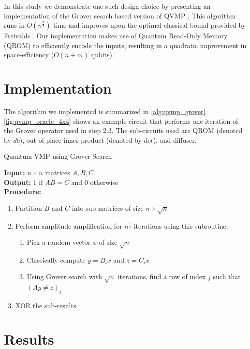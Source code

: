 \documentclass[conference]{IEEEtran}
\begin{document}
  In this study we demonstrate one such design choice by presenting an
  implementation of the Grover search based version of QVMP
  \cite{ambainis2002quantummatrix}. This algorithm runs in $O(n^{\frac{7}{4}})$
  time and improves upon the optimal classical bound provided by Freivalds
  \cite{freivalds1979fast}. Our implementation makes use of Quantum Read-Only
  Memory (QROM) \cite{babbush2018encoding} to efficiently encode the inputs,
  resulting in a quadratic improvement in space-efficiency ($O(n + m)$ qubits).
  
\section{Implementation}

The algorithm we implemented is summarized in \cref{alg:qvmp_grover}.
\cref{fig:qvmp_oracle_4x4} shows an example circuit that performs one iteration
of the Grover operator used in step 2.3. The sub-circuits used are QROM (denoted
by $db$), out-of-place inner product (denoted by $dot$), and diffuser.

\begin{algorithm}
  \caption{Quantum VMP using Grover Search ~\cite{lanl2018quantum}}
  \label{alg:qvmp_grover}
  \textbf{Input: } $n \times n$ matrices $A, B, C$ \\
  \textbf{Output: } 1 if $AB = C$ and 0 otherwise \\
  \textbf{Procedure: }
  \begin{enumerate}
    \item Partition $B$ and $C$ into sub-matrices of size $n \times \sqrt{n}$
    \item 
      {
        Perform amplitude amplification for $n^{\frac{1}{4}}$ iterations using this subroutine:
        \begin{enumerate}
          \item Pick a random vector $x$ of size $\sqrt{n}$
          \item Classically compute $y = B_ix$ and $z = C_ix$
          \item Using Grover search with $\sqrt{n}$ iterations, find a row of
            index $j$ such that $(Ay \neq z)_j$
        \end{enumerate}
      }
    \item XOR the sub-results
  \end{enumerate}
\end{algorithm}


\section{Results}
\end{document}
